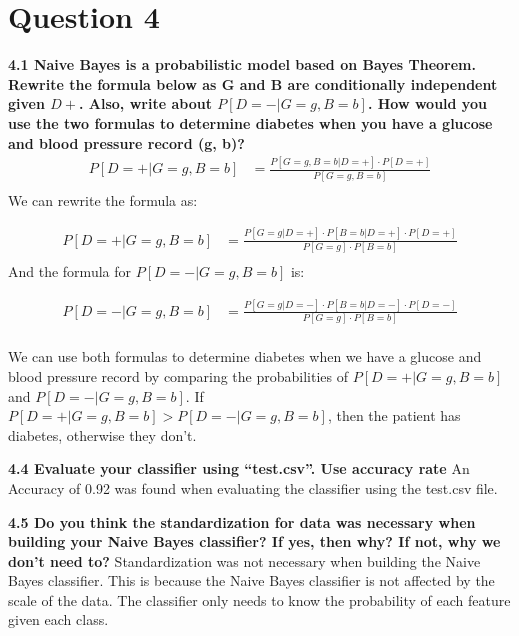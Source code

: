 \documentclass{article}
\begin{document}

\section*{Question 4}
\noindent \textbf{4.1 Naive Bayes is a probabilistic model based on Bayes Theorem. Rewrite the formula below as G and B are conditionally independent given $D+$. Also, write about $P [D = -|G = g, B = b]$. How would you use the two formulas to determine diabetes when you have a glucose and blood pressure record (g, b)?}
\begin{align*}
    P[D = +|G = g, B = b] &= \frac{P[G = g, B = b|D = +] \cdot P[D = +]}{P[G = g, B = b]} \\
\end{align*}
We can rewrite the formula as:

\begin{align*}
    P[D = +|G = g, B = b] &= \frac{P[G = g|D = +] \cdot P[B = b|D = +] \cdot P[D = +]}{P[G = g] \cdot P[B = b]} \\
\end{align*}
And the formula for $P[D = -|G = g, B = b]$ is:

\begin{align*}
    P[D = -|G = g, B = b] &= \frac{P[G = g|D = -] \cdot P[B = b|D = -] \cdot P[D = -]}{P[G = g] \cdot P[B = b]} \\
\end{align*}

\noindent We can use both formulas to determine diabetes when we have a glucose and blood pressure record by comparing the probabilities of $P[D = +|G = g, B = b]$ and $P[D = -|G = g, B = b]$. If $P[D = +|G = g, B = b] > P[D = -|G = g, B = b]$, then the patient has diabetes, otherwise they don't.

\bigbreak

\noindent \textbf{4.4 Evaluate your classifier using “test.csv”. Use accuracy rate} \newline
An Accuracy of 0.92 was found when evaluating the classifier using the test.csv file.

\bigbreak

\noindent \textbf{4.5 Do you think the standardization for data was necessary when building your Naive Bayes
classifier? If yes, then why? If not, why we don't need to?} \newline
Standardization was not necessary when building the Naive Bayes classifier. This is because the Naive Bayes classifier is not affected by the scale of the data. The classifier only needs to know the probability of each feature given each class.
\end{document}
